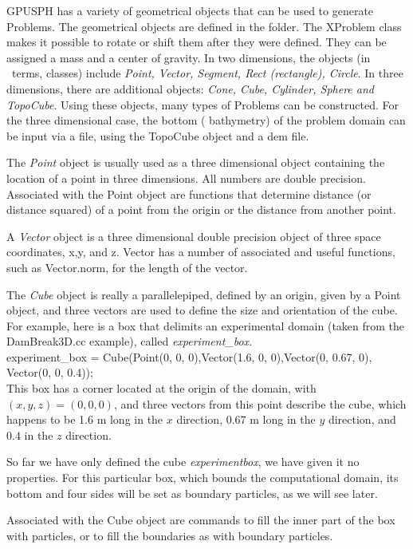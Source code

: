 \documentclass{../GPUSPHtemplate}
\begin{document}
GPUSPH has a variety of geometrical objects that can be used to generate Problems.
The geometrical objects are defined in the  folder.
The XProblem class makes it possible to rotate or shift them after they were defined.
They can be assigned a mass and a center of gravity.
In two dimensions, the objects (in \cpp\ terms, classes) include {\em
Point, Vector, Segment, Rect (rectangle), Circle}. In three
dimensions, there are additional objects: {\em Cone, Cube, Cylinder,
Sphere and TopoCube}. Using these objects, many types of Problems can
be constructed. For the three dimensional case, the bottom (
bathymetry) of the problem domain can be input via a file, using the
TopoCube object and a dem file.

The {\em Point} object is usually used as a three dimensional object
containing the location of a point in three dimensions. All numbers are
double precision. Associated with the Point object are functions that
determine distance (or distance squared) of a point from the origin or
the distance from another point.

A {\em Vector} object is a three dimensional double precision object of
three space coordinates, x,y, and z. Vector has a number of associated
and useful functions, such as Vector.norm, for the length of the vector.


The {\em Cube} object is really a parallelepiped, defined by an origin,
given by a Point object, and three vectors are used to define the size
and orientation of the cube. For example, here is a box that delimits
an experimental domain (taken from the DamBreak3D.cc example), called
{\em experiment\_box.} \\

\noindent experiment\_box = Cube(Point(0, 0, 0),Vector(1.6, 0,
0),Vector(0, 0.67, 0), Vector(0, 0, 0.4));\\

This box has a corner located at the origin of the domain, with $(x, y,
z) = (0,0,0)$, and three vectors from this point describe the cube,
which happens to be 1.6 m long in the $x$ direction, 0.67 m long in the
$y$ direction, and $0.4$ in the $z$ direction.

So far we have only defined the cube {\em experiment\-box}, we have
given it no properties. For this particular box, which bounds the
computational domain, its bottom and four sides will be set as boundary
particles, as we will see later.

Associated with the Cube object are commands to fill the inner part of
the box with particles, or to fill the boundaries as with boundary
particles. %
\end{document}

